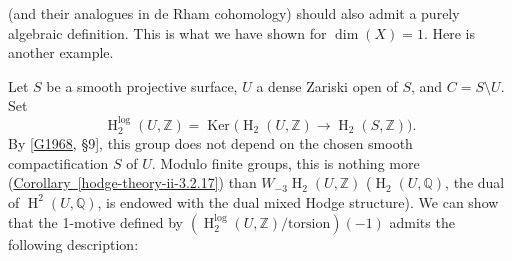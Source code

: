     (and their analogues in de Rham cohomology) should also admit a purely algebraic definition.
    This is what we have shown for \(\dim (X)=1\).
    Here is another example.\label{hodge-theory-iii-10.4.2}\par{}Let \(S\) be a smooth projective surface, \(U\) a dense Zariski open of \(S\), and \(C=S\setminus  U\).
    Set
    \[       \operatorname {H}_2^{\log }(U,\mathbb {Z})       = \operatorname {Ker}\big ( \operatorname {H}_2(U,\mathbb {Z})\to \operatorname {H}_2(S,\mathbb {Z}) \big ).     \]
    By [\hyperref[G1968]{G1968}, §9], this group does not depend on the chosen smooth compactification \(S\) of \(U\).
    Modulo finite groups, this is nothing more (\hyperref[hodge-theory-ii-3.2.17]{Corollary~\ref*{hodge-theory-ii-3.2.17}}) than \(W_{-3}\operatorname {H}_2(U,\mathbb {Z})\) (\(\operatorname {H}_2(U,\mathbb {Q})\), the dual of \(\operatorname {H}^2(U,\mathbb {Q})\), is endowed with the dual mixed Hodge structure).
    We can show that the 1-motive defined by \((\operatorname {H}_2^{\log }(U,\mathbb {Z})/\mathrm {torsion})(-1)\) admits the following description:

